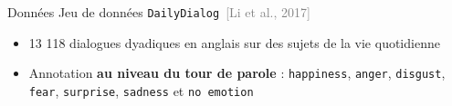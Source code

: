 \documentclass[11pt,aspectratio=169]{beamer}
\newcommand{\manualcite}[1]{\textcolor{gray}{\small[#1]}}
\begin{document}
\begin{frame}{Données}
    Jeu de données \texttt{DailyDialog}~\manualcite{Li et al., 2017}
    \begin{itemize}
        \item 13 118 dialogues dyadiques en anglais sur des sujets de la vie quotidienne
        \item Annotation \textcolor{roose}{\bf au niveau du tour de parole} : \texttt{happiness}, \texttt{anger}, \texttt{disgust}, \texttt{fear}, \texttt{surprise}, \texttt{sadness} et \texttt{no emotion}
    \end{itemize}
\vspace*{5pt}
\end{frame}
\end{document}

